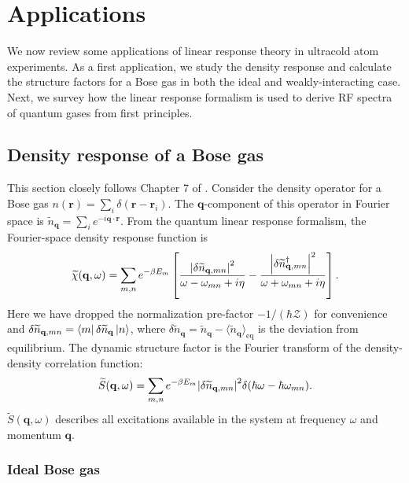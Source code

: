 \documentclass[prl,
twocolumn,
nofootinbib,
amsmath,amssymb,
aps]{revtex4-1}
\newcommand{\be}{\beta}
\newcommand{\f}[2]{\frac{#1}{#2}}
\newcommand{\lb}{\left[}
\newcommand{\rb}{\right]}
\begin{document}
%
\section{Applications}
We now review some applications of linear response theory in ultracold atom experiments. As a first application, we study the density response and calculate the structure factors for a Bose gas in both the ideal and weakly-interacting case. Next, we survey how the linear response formalism is used to derive RF spectra of quantum gases from first principles.

\subsection{Density response of a Bose gas}
\label{sec:Bose}
This section closely follows Chapter 7 of \cite{pitaevskii2016bose}. Consider the density operator for a Bose gas $n(\mathbf{r}) = \sum_i \delta(\mathbf{r} - \mathbf{r}_i)$. The $\mathbf{q}$-component of this operator in Fourier space is $\widetilde{n}_\mathbf{q} = \sum_i e^{-i \mathbf{q}\cdot \mathbf{r}}$. From the quantum linear response formalism, the Fourier-space density response function is
\begin{align*}
\widetilde{\chi}(\mathbf{q},\omega) = \sum_{m,n} e^{-\be E_m} 
\lb 
\f{\abs{\delta \widetilde{n}_{\mathbf{q},mn}}^2}{\omega - \omega_{mn} + i\eta} 
- 
\f{\abs{\delta \widetilde{n}_{\mathbf{q},mn}^\dagger}^2}{\omega + \omega_{mn} + i\eta} 
\rb.
\end{align*}
Here we have dropped the normalization pre-factor $-1/(\hbar \mathcal{Z})$ for convenience and $\delta \widetilde{n}_{\mathbf{q},mn} = \bra{m} \delta \widetilde{n}_{\mathbf{q}} \ket{n}$, where $\delta \widetilde{n}_\mathbf{q} = \widetilde{n}_\mathbf{q} - \langle \widetilde{n}_\mathbf{q} \rangle_\text{eq}$ is the deviation from equilibrium. The dynamic structure factor is the Fourier transform of the density-density correlation function:
\begin{align*}
\widetilde{S}(\mathbf{q},\omega) = \sum_{m,n} e^{-\be E_m} \abs{\delta \widetilde{n}_{\mathbf{q},mn}}^2 \delta(\hbar \omega - \hbar \omega_{mn}).
\end{align*}
$\widetilde{S}(\mathbf{q},\omega)$ describes all excitations available in the system at frequency $\omega$ and momentum $\mathbf{q}$. 

\subsubsection{Ideal Bose gas}
\end{document}
